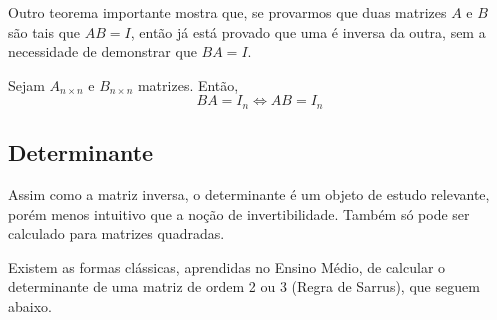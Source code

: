 \documentclass[../main.tex]{subfiles}
\begin{document}
			Outro teorema importante mostra que, se provarmos que duas matrizes $A$ e $B$ são tais que $AB=I$, então já está provado que uma é inversa da outra, sem a necessidade de demonstrar que $BA=I$.
			\begin{teorema}
				Sejam $A_{n\times n}$ e $B_{n\times n}$ matrizes. Então,
				\[
				BA=I_n\Leftrightarrow AB=I_n
				\]
			\end{teorema}
		\subsection{Determinante}
			Assim como a matriz inversa, o determinante é um objeto de estudo relevante, porém menos intuitivo que a noção de invertibilidade. Também só pode ser calculado para matrizes quadradas.
			
			Existem as formas clássicas, aprendidas no Ensino Médio, de calcular o determinante de uma matriz de ordem 2 ou 3 (Regra de Sarrus), que seguem abaixo.
\end{document}
